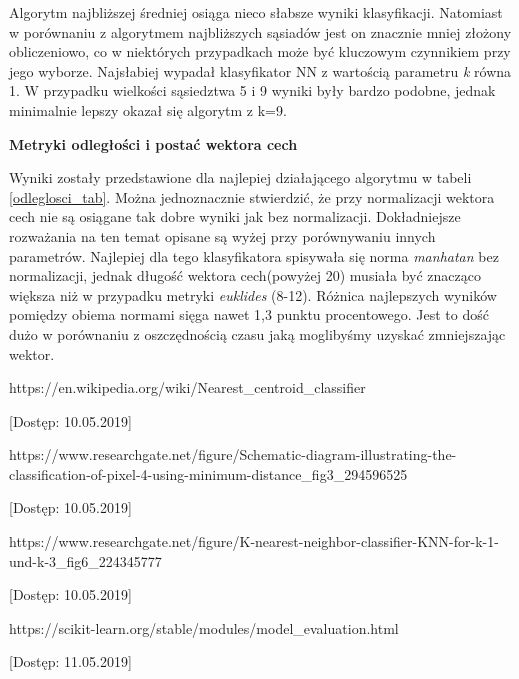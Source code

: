 \documentclass[12pt]{article}
\begin{document}
\indent Algorytm najbliższej średniej osiąga nieco słabsze wyniki klasyfikacji. Natomiast w porównaniu z algorytmem najbliższych sąsiadów jest on znacznie mniej złożony obliczeniowo, co w niektórych przypadkach może być kluczowym czynnikiem przy jego wyborze. Najsłabiej wypadał klasyfikator NN z wartością parametru \textit{k} równa 1. W przypadku wielkości sąsiedztwa 5 i 9 wyniki były bardzo podobne, jednak minimalnie lepszy okazał się algorytm z k=9.\\

\centerline{\textbf{Metryki odległości i postać wektora cech}}

\indent Wyniki zostały przedstawione dla najlepiej działającego algorytmu w tabeli \ref{odleglosci_tab}. Można jednoznacznie stwierdzić, że przy normalizacji wektora cech nie są osiągane tak dobre wyniki jak bez normalizacji. Dokładniejsze rozważania na ten temat opisane są wyżej przy porównywaniu innych parametrów. Najlepiej dla tego klasyfikatora spisywała się norma \textit{manhatan} bez normalizacji, jednak długość wektora cech(powyżej 20) musiała być znacząco większa niż w przypadku metryki \textit{euklides} (8-12). Różnica najlepszych wyników pomiędzy obiema normami sięga nawet 1,3 punktu procentowego. Jest to dość dużo w porównaniu z oszczędnością czasu jaką moglibyśmy uzyskać zmniejszając wektor.

\newpage
\renewcommand\refname{Bibliografia}
\begin{thebibliography}{9}

  https://en.wikipedia.org/wiki/Nearest\_centroid\_classifier

[Dostęp: 10.05.2019]

  https://www.researchgate.net/figure/Schematic-diagram-illustrating-the-classification-of-pixel-4-using-minimum-distance\_fig3\_294596525

[Dostęp: 10.05.2019]

  https://www.researchgate.net/figure/K-nearest-neighbor-classifier-KNN-for-k-1-und-k-3\_fig6\_224345777

[Dostęp: 10.05.2019]

  https://scikit-learn.org/stable/modules/model\_evaluation.html

[Dostęp: 11.05.2019]

\end{thebibliography}
\end{document}
